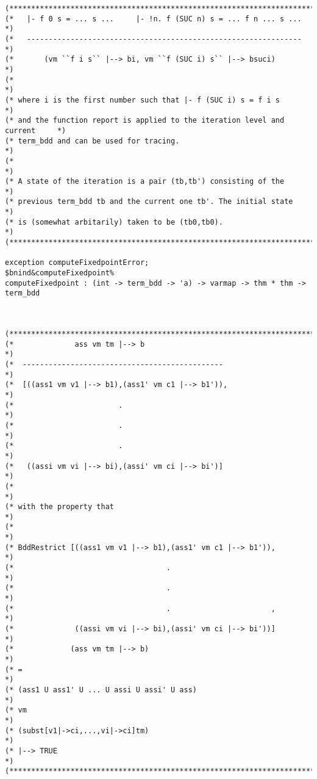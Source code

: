 \documentclass[12pt]{article}
\begin{document}
\begin{footnotesize}
\begin{Verbatim}[commandchars=\$\&\%]
(*****************************************************************************)
(*   |- f 0 s = ... s ...     |- !n. f (SUC n) s = ... f n ... s ...         *)
(*   ---------------------------------------------------------------         *)
(*       (vm ``f i s`` |--> bi, vm ``f (SUC i) s`` |--> bsuci)               *)
(*                                                                           *)
(* where i is the first number such that |- f (SUC i) s = f i s              *)
(* and the function report is applied to the iteration level and current     *)
(* term_bdd and can be used for tracing.                                     *)
(*                                                                           *)
(* A state of the iteration is a pair (tb,tb') consisting of the             *)
(* previous term_bdd tb and the current one tb'. The initial state           *)
(* is (somewhat arbitarily) taken to be (tb0,tb0).                           *)
(*****************************************************************************)

exception computeFixedpointError;
$bnind&computeFixedpoint%
computeFixedpoint : (int -> term_bdd -> 'a) -> varmap -> thm * thm -> term_bdd



(*****************************************************************************)
(*              ass vm tm |--> b                                             *)
(*  ----------------------------------------------                           *)
(*  [((ass1 vm v1 |--> b1),(ass1' vm c1 |--> b1')),                          *)
(*                        .                                                  *)
(*                        .                                                  *)
(*                        .                                                  *)
(*   ((assi vm vi |--> bi),(assi' vm ci |--> bi')]                           *)
(*                                                                           *)
(* with the property that                                                    *)
(*                                                                           *)
(* BddRestrict [((ass1 vm v1 |--> b1),(ass1' vm c1 |--> b1')),               *)
(*                                   .                                       *)
(*                                   .                                       *)
(*                                   .                       ,               *)
(*              ((assi vm vi |--> bi),(assi' vm ci |--> bi'))]               *)
(*             (ass vm tm |--> b)                                            *)
(* =                                                                         *)
(* (ass1 U ass1' U ... U assi U assi' U ass)                                 *)
(* vm                                                                        *)
(* (subst[v1|->ci,...,vi|->ci]tm)                                            *)
(* |--> TRUE                                                                 *)
(*****************************************************************************)


\end{Verbatim}
\end{footnotesize}
\end{document}
